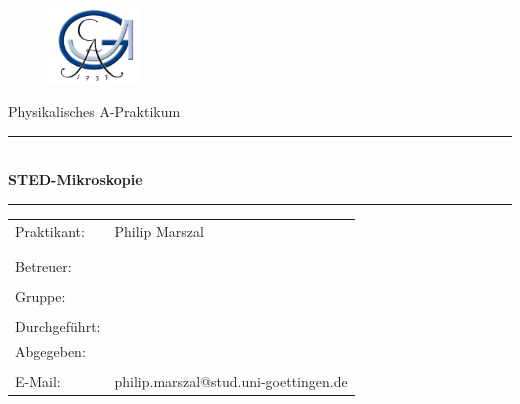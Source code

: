 \documentclass[a4paper, 12pt]{article}
\begin{document}
 \begin{titlepage}
 \begin{figure}[t]
 \includegraphics[height=2cm]{georg} \hfill
 \end{figure}

\normalsize
\vspace{1cm}

\begin{center}
\Large Physikalisches A-Praktikum \\ \vspace{1cm}
\hrule \vspace{3mm}
\large {} \\
\Huge{\bf STED-Mikroskopie}
\vspace{5mm}
\hrule
\end{center}

\normalsize

\begin{table}[!h]
\begin{center}

  \begin{tabular}{ll}
  Praktikant: &Philip Marszal\\
   &\\
   &\\
  Betreuer: & \\
  &\\
  Gruppe: &\\
  &\\
  Durchgeführt: &\\
  Abgegeben: &\\

\vspace{1cm}& \\
  E-Mail: & \ttfamily philip.marszal@stud.uni-goettingen.de\\
\end{tabular}
\end{center}
\end{table}
\vspace{2cm}
\flushright{}
\end{titlepage}
\end{document}
